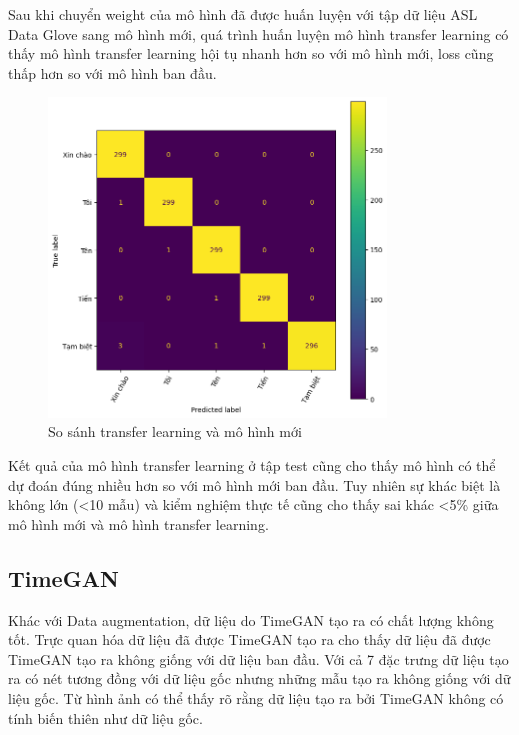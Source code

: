 Sau khi chuyển weight của mô hình đã được huấn luyện với tập dữ liệu ASL Data Glove sang mô hình mới, quá trình huấn luyện mô hình transfer learning có thấy mô hình transfer learning hội tụ nhanh hơn so với mô hình mới, loss cũng thấp hơn so với mô hình ban đầu. 

\begin{figure}[H]
    \centering
    \includegraphics[width=0.8\textwidth]{Images/Improvement results/transfer_learning_confusion_matrix.png}
    \caption{So sánh transfer learning và mô hình mới}
    \label{fig:transfer_learning_training_result_compare}
\end{figure}

Kết quả của mô hình transfer learning ở tập test cũng cho thấy mô hình có thể dự đoán đúng nhiều hơn so với mô hình mới ban đầu. Tuy nhiên sự khác biệt là không lớn (<10 mẫu) và kiểm nghiệm thực tế cũng cho thấy sai khác <5\% giữa mô hình mới và mô hình transfer learning.


\subsection{TimeGAN}

Khác với Data augmentation, dữ liệu do TimeGAN tạo ra có chất lượng không tốt. Trực quan hóa dữ liệu đã được TimeGAN tạo ra cho thấy dữ liệu đã được TimeGAN tạo ra không giống với dữ liệu ban đầu. Với cả 7 đặc trưng dữ liệu tạo ra có nét tương đồng với dữ liệu gốc nhưng những mẫu tạo ra không giống với dữ liệu gốc. Từ hình ảnh có thể thấy rõ rằng dữ liệu tạo ra bởi TimeGAN không có tính biến thiên như dữ liệu gốc.

